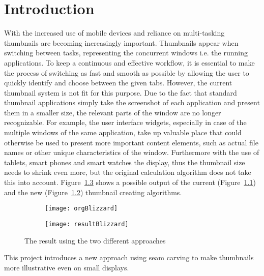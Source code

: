 \documentclass[draft,final]{vutinfth} %
\begin{document}
	\mainmatter
	
	\chapter{Introduction}
	With the increased use of mobile devices and reliance on multi-tasking thumbnails are becoming increasingly important.
	Thumbnails appear when switching between tasks, representing the concurrent windows i.e. the running applications.
	To keep a continuous and effective workflow, it is essential to make the process of switching as fast and smooth as possible by allowing the user to quickly identify and choose between the given tabs. 
	However, the current thumbnail system is not fit for this purpose. 
	Due to the fact that standard thumbnail applications simply take the screenshot of each application and present them in a smaller size, the relevant parts of the window are no longer recognizable. 
	For example, the user interface widgets, especially in case of the multiple windows of the same application, take up valuable place that could otherwise be used to present more important content elements, such as actual file names or other unique characteristics of the window.
	Furthermore with the use of tablets, smart phones and smart watches the display, thus the thumbnail size needs to shrink even more, but the original calculation algorithm does not take this into account.
	Figure~\ref{fig:introo} shows a possible output of the current (Figure~\ref{fig:introo:org}) and the new (Figure~\ref{fig:introo:res}) thumbnail creating algorithms.\par 
	\begin{figure}[h]
		\centering
		\begin{subfigure}[b]{0.45\columnwidth}
			\centering
			\texttt{[image: orgBlizzard]}
			\label{fig:introo:org}
		\end{subfigure}
		\begin{subfigure}[b]{0.45\columnwidth}
			\centering
			\texttt{[image: resultBlizzard]}
			\label{fig:introo:res}
		\end{subfigure}
		\caption{The result using the two different approaches}
		\label{fig:introo} %
	\end{figure}
	This project introduces a new approach using seam carving to make thumbnails more illustrative even on small displays.
\end{document}
